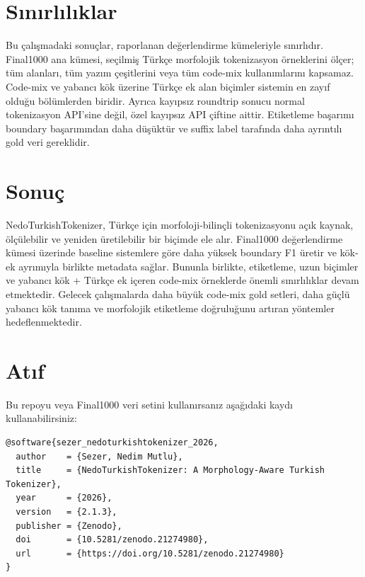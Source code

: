 \documentclass[11pt]{article}
\begin{document}
\section{Sınırlılıklar}
Bu çalışmadaki sonuçlar, raporlanan değerlendirme kümeleriyle sınırlıdır. Final1000 ana kümesi, seçilmiş Türkçe morfolojik tokenizasyon örneklerini ölçer; tüm alanları, tüm yazım çeşitlerini veya tüm code-mix kullanımlarını kapsamaz. Code-mix ve yabancı kök üzerine Türkçe ek alan biçimler sistemin en zayıf olduğu bölümlerden biridir. Ayrıca kayıpsız roundtrip sonucu normal tokenizasyon API'sine değil, özel kayıpsız API çiftine aittir. Etiketleme başarımı boundary başarımından daha düşüktür ve suffix label tarafında daha ayrıntılı gold veri gereklidir.

\section{Sonuç}
NedoTurkishTokenizer, Türkçe için morfoloji-bilinçli tokenizasyonu açık kaynak, ölçülebilir ve yeniden üretilebilir bir biçimde ele alır. Final1000 değerlendirme kümesi üzerinde baseline sistemlere göre daha yüksek boundary F1 üretir ve kök-ek ayrımıyla birlikte metadata sağlar. Bununla birlikte, etiketleme, uzun biçimler ve yabancı kök + Türkçe ek içeren code-mix örneklerde önemli sınırlılıklar devam etmektedir. Gelecek çalışmalarda daha büyük code-mix gold setleri, daha güçlü yabancı kök tanıma ve morfolojik etiketleme doğruluğunu artıran yöntemler hedeflenmektedir.

\section*{Atıf}
Bu repoyu veya Final1000 veri setini kullanırsanız aşağıdaki kaydı kullanabilirsiniz:

\begin{verbatim}
@software{sezer_nedoturkishtokenizer_2026,
  author    = {Sezer, Nedim Mutlu},
  title     = {NedoTurkishTokenizer: A Morphology-Aware Turkish Tokenizer},
  year      = {2026},
  version   = {2.1.3},
  publisher = {Zenodo},
  doi       = {10.5281/zenodo.21274980},
  url       = {https://doi.org/10.5281/zenodo.21274980}
}
\end{verbatim}
\end{document}
